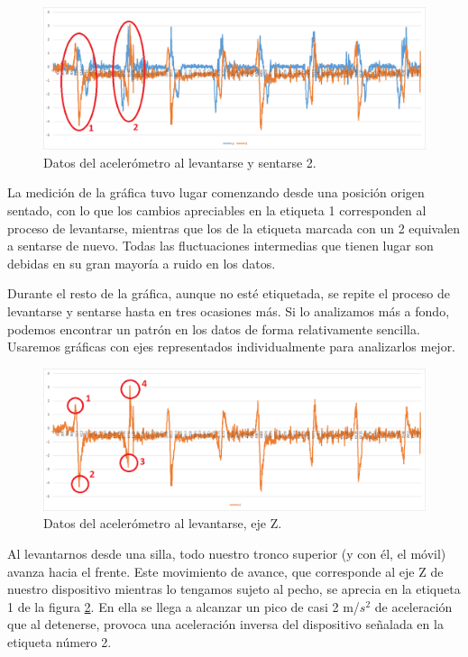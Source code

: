 \begin{figure}[H]
	\centering
	\includegraphics[scale=0.395]{imagenes/grafico_completo_silla.png}
	\caption{Datos del acelerómetro al levantarse y sentarse 2.\label{fig:acc_2}}
\end{figure}

La medición de la gráfica tuvo lugar comenzando desde una posición origen sentado, con lo que los cambios apreciables en la etiqueta 1 corresponden al proceso de levantarse, mientras que los de la etiqueta marcada con un 2 equivalen a sentarse de nuevo. Todas las fluctuaciones intermedias que tienen lugar son debidas en su gran mayoría a ruido en los datos.

Durante el resto de la gráfica, aunque no esté etiquetada, se repite el proceso de levantarse y sentarse hasta en tres ocasiones más. Si lo analizamos más a fondo, podemos encontrar un patrón en los datos de forma relativamente sencilla. Usaremos gráficas con ejes representados individualmente para analizarlos mejor.

\begin{figure}[H]
	\centering
	\includegraphics[scale=0.395]{imagenes/grafico_z_silla.png}
	\caption{Datos del acelerómetro al levantarse, eje Z.\label{fig:acc_3}}
\end{figure}

Al levantarnos desde una silla, todo nuestro tronco superior (y con él, el móvil) avanza hacia el frente. Este movimiento de avance, que corresponde al eje Z de nuestro dispositivo mientras lo tengamos sujeto al pecho, se aprecia en la etiqueta 1 de la figura \ref{fig:acc_3}. En ella se llega a alcanzar un pico de casi 2 m/$s^{2}$ de aceleración que al detenerse, provoca una aceleración inversa del dispositivo señalada en la etiqueta número 2.

